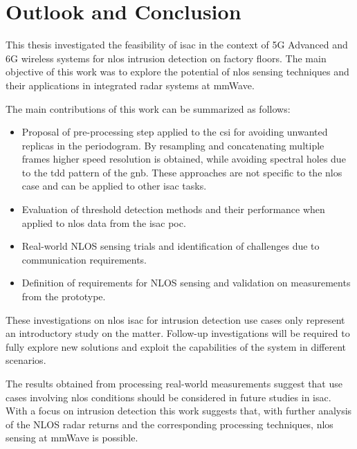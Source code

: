 \chapter{Outlook and Conclusion}

This thesis investigated the feasibility of \gls{isac} in the context of 5G Advanced and 6G wireless systems for \gls{nlos} intrusion detection on factory floors.
The main objective of this work was to explore the potential of \gls{nlos} sensing techniques and their applications in integrated radar systems at mmWave. 

The main contributions of this work can be summarized as follows:

\begin{itemize}
	\item Proposal of pre-processing step applied to the \gls{csi} for avoiding unwanted replicas in the periodogram. By resampling and concatenating multiple frames higher speed resolution is obtained, while avoiding spectral holes due to the \gls{tdd} pattern of the \gls{gnb}. These approaches are not specific to the \gls{nlos} case and can be applied to other \gls{isac} tasks.
	\item Evaluation of threshold detection methods and their performance when applied to \gls{nlos} data from the \gls{isac} \gls{poc}.
	\item Real-world NLOS sensing trials and identification of challenges due to communication requirements.
	\item Definition of requirements for NLOS sensing and validation on measurements from the prototype.
\end{itemize}

These investigations on \gls{nlos} \gls{isac} for intrusion detection use cases only represent an introductory study on the matter.
Follow-up investigations will be required to fully explore new solutions and exploit the capabilities of the system in different scenarios.

The results obtained from processing real-world measurements suggest that use cases involving \gls{nlos} conditions should be considered in future studies in \gls{isac}.
With a focus on intrusion detection this work suggests that, with further analysis of the NLOS radar returns and the corresponding processing techniques, \gls{nlos} sensing at mmWave is possible.

